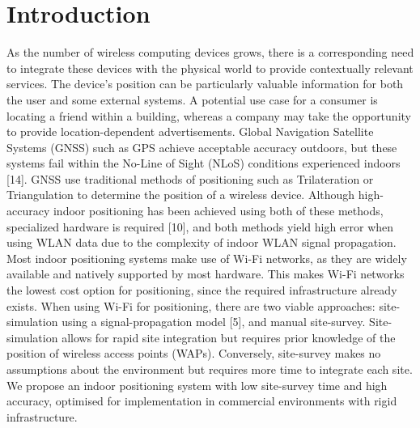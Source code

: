 \documentclass[conference]{IEEEtran}
\begin{document}
\section{Introduction}
As the number of wireless computing devices grows, there is a corresponding need to integrate these devices with the physical world to provide contextually relevant services. The device's position can be particularly valuable information for both the user and some external systems. A potential use case for a consumer is locating a friend within a building, whereas a company may take the opportunity to provide location-dependent advertisements.
Global Navigation Satellite Systems (GNSS) such as GPS achieve acceptable accuracy outdoors, but these systems fail within the No-Line of Sight (NLoS) conditions experienced indoors [14]. GNSS use traditional methods of positioning such as Trilateration or Triangulation to determine the position of a wireless device. Although high-accuracy indoor positioning has been achieved using both of these methods, specialized hardware is required [10], and both methods yield high error when using WLAN data due to the complexity of indoor WLAN signal propagation.\\ 
\indent Most indoor positioning systems make use of Wi-Fi networks, as they are widely available and natively supported by most hardware. This makes Wi-Fi networks the lowest cost option for positioning, since the required infrastructure already exists. When using Wi-Fi for positioning, there are two viable approaches: site-simulation using a signal-propagation model [5], and manual site-survey. Site-simulation allows for rapid site integration but requires prior knowledge of the position of wireless access points (WAPs). Conversely, site-survey makes no assumptions about the environment but requires more time to integrate each site.\\ 
\indent We propose an indoor positioning system with low site-survey time and high accuracy, optimised for implementation in commercial environments with rigid infrastructure.
\end{document}
